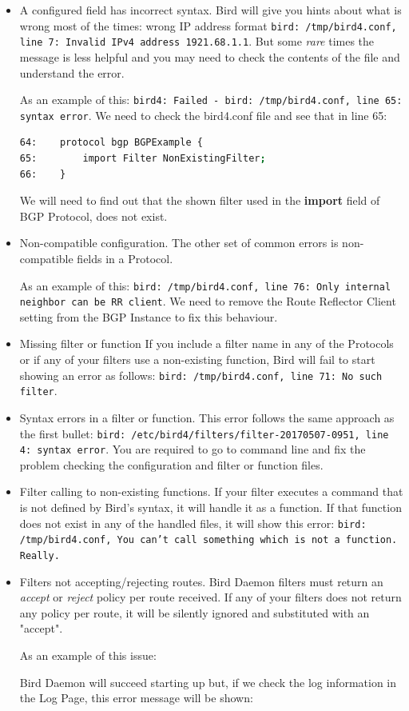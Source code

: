 \begin{itemize}
\item A configured field has incorrect syntax.
Bird will give you hints about what is wrong most of the times: wrong IP address format \texttt{bird: /tmp/bird4.conf, line 7: Invalid IPv4 address 1921.68.1.1}. But some \textit{rare} times the message is less helpful and you may need to check the contents of the file and understand the error.

As an example of this: \texttt{bird4: Failed - bird: /tmp/bird4.conf, line 65: syntax error}. We need to check the bird4.conf file and see that in line 65:

\begin{lstlisting}[language=bash, caption={Bird4.conf contents}]
64:    protocol bgp BGPExample {
65:        import Filter NonExistingFilter;
66:    }
\end{lstlisting}

We will need to find out that the shown filter used in the \textbf{import} field of BGP Protocol, does not exist.

\item Non-compatible configuration.
The other set of common errors is non-compatible fields in a Protocol.

As an example of this: \texttt{bird: /tmp/bird4.conf, line 76: Only internal neighbor can be RR client}. We need to remove the Route Reflector Client setting from the BGP Instance to fix this behaviour.

\item Missing filter or function
If you include a filter name in any of the Protocols or if any of your filters use a non-existing function, Bird will fail to start showing an error as follows: \texttt{bird: /tmp/bird4.conf, line 71: No such filter}.

\item Syntax errors in a filter or function.
This error follows the same approach as the first bullet: \texttt{bird: /etc/bird4/filters/filter-20170507-0951, line 4: syntax error}. You are required to go to command line and fix the problem checking the configuration and filter or function files.

\item Filter calling to non-existing functions.
If your filter executes a command that is not defined by Bird's syntax, it will handle it as a function. If that function does not exist in any of the handled files, it will show this error: \texttt{bird: /tmp/bird4.conf, You can't call something which is not a function. Really.}

\item Filters not accepting/rejecting routes.
Bird Daemon filters must return an \textit{accept} or \textit{reject} policy per route received. If any of your filters does not return any policy per route, it will be silently ignored and substituted with an "accept".

As an example of this issue:


Bird Daemon will succeed starting up but, if we check the log information in the Log Page, this error message will be shown:


\end{itemize}

